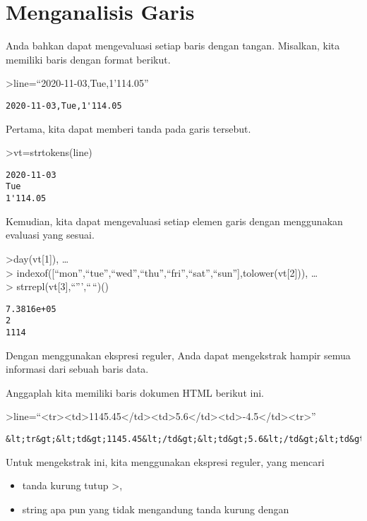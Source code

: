 \documentclass[
]{book}
\providecommand{\tightlist}{%
  \setlength{\itemsep}{0pt}\setlength{\parskip}{0pt}}
\begin{document}
\chapter{Menganalisis Garis}\label{menganalisis-garis}

Anda bahkan dapat mengevaluasi setiap baris dengan tangan. Misalkan, kita memiliki baris dengan format berikut.

\textgreater line=``2020-11-03,Tue,1'114.05''

\begin{verbatim}
2020-11-03,Tue,1'114.05
\end{verbatim}

Pertama, kita dapat memberi tanda pada garis tersebut.

\textgreater vt=strtokens(line)

\begin{verbatim}
2020-11-03
Tue
1'114.05
\end{verbatim}

Kemudian, kita dapat mengevaluasi setiap elemen garis dengan menggunakan evaluasi yang sesuai.

\textgreater day(vt{[}1{]}), \ldots{}\\
\textgreater{} indexof({[}``mon'',``tue'',``wed'',``thu'',``fri'',``sat'',``sun''{]},tolower(vt{[}2{]})), \ldots{}\\
\textgreater{} strrepl(vt{[}3{]},``''',``\,``)()

\begin{verbatim}
7.3816e+05
2
1114
\end{verbatim}

Dengan menggunakan ekspresi reguler, Anda dapat mengekstrak hampir semua informasi dari sebuah baris data.

Anggaplah kita memiliki baris dokumen HTML berikut ini.

\textgreater line=``\textless tr\textgreater\textless td\textgreater1145.45\textless/td\textgreater\textless td\textgreater5.6\textless/td\textgreater\textless td\textgreater-4.5\textless/td\textgreater\textless tr\textgreater{}''

\begin{verbatim}
&lt;tr&gt;&lt;td&gt;1145.45&lt;/td&gt;&lt;td&gt;5.6&lt;/td&gt;&lt;td&gt;-4.5&lt;/td&gt;&lt;tr&gt;
\end{verbatim}

Untuk mengekstrak ini, kita menggunakan ekspresi reguler, yang mencari

\begin{itemize}
\tightlist
\item
  tanda kurung tutup \textgreater,\\
\item
  string apa pun yang tidak mengandung tanda kurung dengan
\end{itemize}
\end{document}
